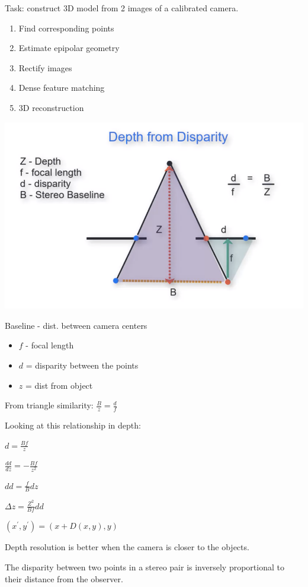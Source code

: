 \begin{enumerate}
Task: construct 3D model from 2 images of a calibrated camera.

\begin{enumerate}
\item Find corresponding points
\item Estimate epipolar geometry
\item Rectify images
\item Dense feature matching
\item 3D reconstruction
\end{enumerate}

\includegraphics[width=0.9\columnwidth]{cv_figures/disparity.png}

Baseline - dist. between camera centers
\begin{itemize}
\item $f$ - focal length
\item $d$ = disparity between the points
\item $z$ = dist from object
\end{itemize}

From triangle similarity: $\frac{B}{z} = \frac{d}{f}$

Looking at this relationship in depth:

${d}=\frac{Bf}{z} $

$\frac{dd}{dz}=-\frac{Bf}{z^2}$

$dd = \frac{f}{B}dz$

$\Delta z = \frac{Z^2}{Bf}dd$

$(x^\prime,y^\prime)=(x+D(x,y),y)$

Depth resolution is better when the camera is closer to the objects.

The disparity between two points in a stereo pair is inversely proportional to their distance from the observer.



\end{enumerate}
